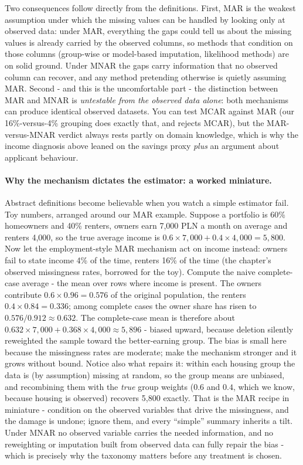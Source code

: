\documentclass[11pt,a4paper]{article}
\begin{document}
Two consequences follow directly from the definitions. First, MAR is the
weakest assumption under which the missing values can be handled by
looking only at observed data: under MAR, everything the gaps could tell
us about the missing values is already carried by the observed columns,
so methods that condition on those columns (group-wise or model-based
imputation, likelihood methods) are on solid ground. Under MNAR the gaps
carry information that no observed column can recover, and any method
pretending otherwise is quietly assuming MAR. Second - and this is the
uncomfortable part - the distinction between MAR and MNAR is
\emph{untestable from the observed data alone}: both mechanisms can
produce identical observed datasets. You can test MCAR against MAR (our
16\%-versus-4\% grouping does exactly that, and rejects MCAR), but the
MAR-versus-MNAR verdict always rests partly on domain knowledge, which is
why the income diagnosis above leaned on the savings proxy \emph{plus} an
argument about applicant behaviour.

\paragraph{Why the mechanism dictates the estimator: a worked miniature.}
Abstract definitions become believable when you watch a simple estimator
fail. Toy numbers, arranged around our MAR example. Suppose a portfolio is
60\% homeowners and 40\% renters, owners earn 7{,}000 PLN a month on
average and renters 4{,}000, so the true average income is
$0.6 \times 7{,}000 + 0.4 \times 4{,}000 = 5{,}800$. Now let the
employment-style MAR mechanism act on income instead: owners fail to state
income 4\% of the time, renters 16\% of the time (the chapter's observed
missingness rates, borrowed for the toy). Compute the naive complete-case
average - the mean over rows where income is present. The owners
contribute $0.6 \times 0.96 = 0.576$ of the original population, the
renters $0.4 \times 0.84 = 0.336$; among complete cases the owner share
has risen to $0.576/0.912 \approx 0.632$. The complete-case mean is
therefore about
$0.632 \times 7{,}000 + 0.368 \times 4{,}000 \approx 5{,}896$ - biased
upward, because deletion silently reweighted the sample toward the
better-earning group. The bias is small here because the missingness
rates are moderate; make the mechanism stronger and it grows without
bound. Notice also what repairs it: within each housing group the data is
(by assumption) missing at random, so the group means are unbiased, and
recombining them with the \emph{true} group weights
($0.6$ and $0.4$, which we know, because housing is observed) recovers
5{,}800 exactly. That is the MAR recipe in miniature - condition on the
observed variables that drive the missingness, and the damage is undone;
ignore them, and every ``simple'' summary inherits a tilt. Under MNAR no
observed variable carries the needed information, and no reweighting or
imputation built from observed data can fully repair the bias - which is
precisely why the taxonomy matters before any treatment is chosen.
\end{document}
